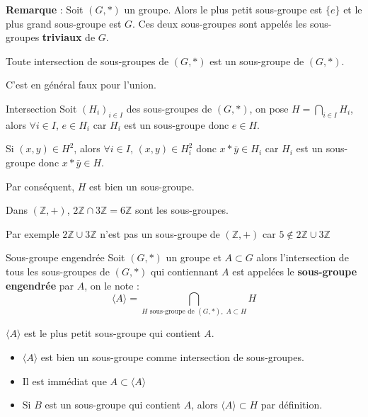 \textbf{Remarque} : Soit $(G, *)$ un groupe. Alors le plus petit sous-groupe est $\{e\}$ et le plus grand sous-groupe est $G$. Ces deux sous-groupes sont appelés les sous-groupes \textbf{triviaux} de $G$.


\begin{Prop}{}{}
Toute intersection de sous-groupes de $(G, *)$ est un sous-groupe de $(G, *)$. 

C'est en général faux pour l'union. 
\end{Prop}

\begin{myproof}{Intersection}{}
Soit $(H_i) _{i \in I}$ des sous-groupes de $(G, *)$, on pose $H = \bigcap _{i \in I} H _i$, alors $\forall i \in I$, $e \in H_i$ car $H_i$ est un sous-groupe donc $e\in H$.

Si $(x,y) \in H ^{2}$, alors $\forall i \in I$, $(x,y) \in H_i ^{2}$ donc $x * \bar{y} \in H_i$ car $H_i$ est un sous-groupe donc $x * \bar{y} \in H$. 

Par conséquent, $H$ est bien un sous-groupe.
\end{myproof}

\begin{Example}{}{}
Dans $(\mathbb{Z},+)$, $2 \mathbb{Z} \cap 3 \mathbb{Z} = 6 \mathbb{Z}$ sont les sous-groupes.

Par exemple $2 \mathbb{Z} \cup 3 \mathbb{Z}$ n'est pas un sous-groupe de $(\mathbb{Z}, +)$ car $5 \not \in 2 \mathbb{Z} \cup 3 \mathbb{Z}$
\end{Example}

\begin{Definition}[colbacktitle=red!75!black]{Sous-groupe engendrée}{}
Soit $(G, *)$ un groupe et $A \subset G$ alors l'intersection de tous les sous-groupes de $(G, *)$ qui contiennant $A$ est appelées le \textbf{sous-groupe engendrée} par $A$, on le note : 
\begin{equation}
  \langle A \rangle = \bigcap _{H \text{ sous-groupe de }(G,*), \; A \subset H} H
\end{equation}
\end{Definition}

\begin{Prop}{}{}
$\langle A \rangle$ est le plus petit sous-groupe qui contient $A$. 
\end{Prop}

\begin{myproof}{}{}
\begin{itemize}

    \item $\langle A \rangle$ est bien un sous-groupe comme intersection de sous-groupes. 
    \item Il est immédiat que $A \subset \langle A \rangle$
    \item Si $B$ est un sous-groupe qui contient $A$, alors $\langle A \rangle \subset H$ par définition.

\end{itemize}
\end{myproof}


